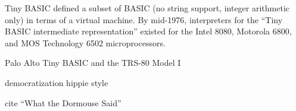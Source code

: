 \begin{geeknote}{}
  Tiny BASIC defined a subset of BASIC (no string support, integer
  arithmetic only) in terms of a virtual machine.  By mid-1976,
  interpreters for the ``Tiny BASIC intermediate representation''
  existed for the Intel 8080, Motorola 6800, and MOS Technology 6502
  microprocessors. 
\end{geeknote}

Palo Alto Tiny BASIC and the TRS-80 Model I

democratization hippie style

cite ``What the Dormouse Said''
